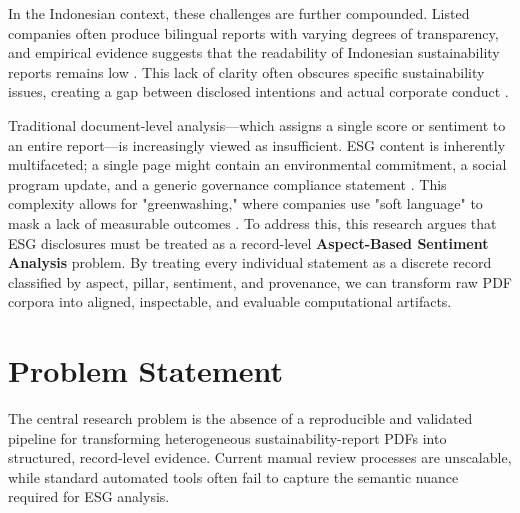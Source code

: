 \documentclass[english, online, cse, master]{dithesis}
\begin{document}
In the Indonesian context, these challenges are further compounded. Listed companies often produce bilingual reports with varying degrees of transparency, and empirical evidence suggests that the readability of Indonesian sustainability reports remains low  \parencite{desi_adhariani_543335d6}. This lack of clarity often obscures specific sustainability issues, creating a gap between disclosed intentions and actual corporate conduct  \parencite{marsdenia_010e13e7}.

Traditional document-level analysis—which assigns a single score or sentiment to an entire report—is increasingly viewed as insufficient. ESG content is inherently multifaceted; a single page might contain an environmental commitment, a social program update, and a generic governance compliance statement  \parencite{keane_ong_0a5de439}. This complexity allows for "greenwashing," where companies use "soft language" to mask a lack of measurable outcomes  \parencite{keane_ong_8fec4760}. To address this, this research argues that ESG disclosures must be treated as a record-level \textbf{Aspect-Based Sentiment Analysis} problem. By treating every individual statement as a discrete record classified by aspect, pillar, sentiment, and provenance, we can transform raw PDF corpora into aligned, inspectable, and evaluable computational artifacts.
\section{Problem Statement}

The central research problem is the absence of a reproducible and validated pipeline for transforming heterogeneous sustainability-report PDFs into structured, record-level evidence. Current manual review processes are unscalable, while standard automated tools often fail to capture the semantic nuance required for ESG analysis.
\end{document}
